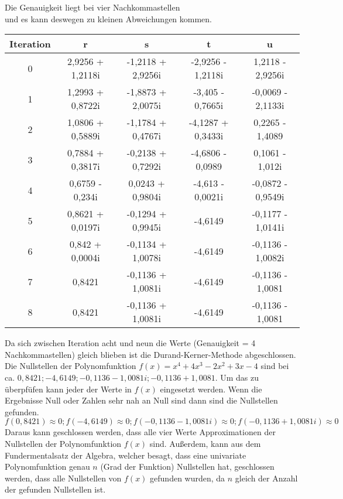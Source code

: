 \documentclass[12pt]{article}
\begin{document}
        
        \begin{center}
        Die Genauigkeit liegt bei vier Nachkommastellen \\ und es kann deswegen zu kleinen Abweichungen kommen.
        \begin{tabular}{c|c c c c}
            Iteration & r & s & t & u \\
            \hline
            0 & 2,9256 + 1,2118i & -1,2118 + 2,9256i & -2,9256 - 1,2118i & 1,2118 - 2,9256i \\
            1 & 1,2993 + 0,8722i & -1,8873 + 2,0075i & -3,405 - 0,7665i & -0,0069 - 2,1133i \\
            2 & 1,0806 + 0,5889i & -1,1784 + 0,4767i & -4,1287 + 0,3433i & 0,2265 - 1,4089 \\
            3 & 0,7884 + 0,3817i & -0,2138 + 0,7292i & -4,6806 - 0,0989 & 0,1061 - 1,012i \\
            4 & 0,6759 - 0,234i & 0,0243 + 0,9804i & -4,613 - 0,0021i & -0,0872 - 0,9549i \\
            5 & 0,8621 + 0,0197i & -0,1294 + 0,9945i & -4,6149 & -0,1177 - 1,0141i \\
            6 & 0,842 + 0,0004i & -0,1134 + 1,0078i & -4,6149 & -0,1136 - 1,0082i \\
            7 & 0,8421 & -0,1136 + 1,0081i & -4,6149 & -0,1136 - 1,0081 \\
            8 & 0,8421 & -0,1136 + 1,0081i & -4,6149 & -0,1136 - 1,0081 \\
        \end{tabular}
        \end{center}
        Da sich zwischen Iteration acht und neun die Werte (Genauigkeit = 4 Nachkommastellen) gleich blieben ist die Durand-Kerner-Methode abgeschlossen. Die Nullstellen der Polynomfunktion $f(x) = x^4 + 4x^3 - 2x^2 + 3x - 4$ sind bei ca. $0,8421; -4,6149; -0,1136 - 1,0081i; -0,1136 + 1,0081$. Um das zu überpfüfen kann jeder der Werte in $f(x)$ eingesetzt werden. Wenn die Ergebnisse Null oder Zahlen sehr nah an Null sind dann sind die Nullstellen gefunden.
        \begin{displaymath}
            f(0,8421) \approx 0; f(-4,6149) \approx 0; f(-0,1136 - 1,0081i) \approx 0; f(-0,1136 + 1,0081i) \approx 0
        \end{displaymath}
        Daraus kann geschlossen werden, dass alle vier Werte Approximationen der Nullstellen der Polynomfunktion $f(x)$ sind. Außerdem, kann aus dem Fundermentalsatz der Algebra, welcher besagt, dass eine univariate Polynomfunktion genau $n$ (Grad der Funktion) Nullstellen hat, geschlossen werden, dass alle Nullstellen von $f(x)$ gefunden wurden, da $n$ gleich der Anzahl der gefunden Nullstellen ist.
        
\end{document}
